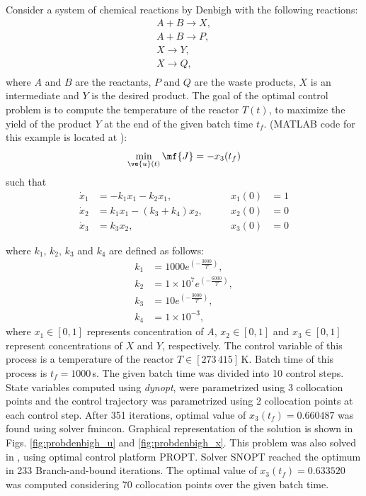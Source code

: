 Consider a system of chemical reactions by Denbigh \cite{den58} with the 
following reactions:
\begin{gather}
A + B \rightarrow X, \\
A + B \rightarrow P, \\
X \rightarrow Y, \\
X \rightarrow Q, \\
\end{gather}
where $A$ and $B$ are the reactants, $P$ and $Q$ are the waste products, $X$ is an intermediate and $Y$ is the desired product. The goal of the optimal control problem is to compute the temperature of the reactor $T(t)$, to maximize the yield of the product $Y$ at the end of the given batch time $t_f$. (MATLAB code for this example is located
at ):
\begin{equation}
\min_{\ve{u}(t)} \mf{J} = -x_{3}(t_{f}) \label{eq:denbigh_dae}
\end{equation}
such that
\begin{align}
\dot{x}_1 & =  -k_{1}x_{1} -k_{2}x_{1} , &\qquad x_1(0) &= 1 \\
\dot{x}_{2}& = k_{1}x_{1} - (k_{3} + k_{4})x_{2} , & \qquad x_2(0) & = 0 \\
\dot{x}_3 & =  k_{3}x_{2} , & \qquad x_3(0) & = 0 
\end{align}

where $k_{1}, \, k_{2}, \, k_{3}$ and $k_{4}$ are defined as follows:
\begin{align}
k_{1} &= 1000 e^{(-\frac{3000}{T})}, \\
k_{2} &= 1 \times 10^{7} e^{(-\frac{6000}{T})}, \\
k_{3} &= 10e^{(-\frac{3000}{T})}, \\
k_{4} &= 1 \times 10^{-3}, 
\end{align} where $x_{1} \in [0, 1] $  represents concentration
of $A$, $x_{2} \in [0, 1] $ and $x_{3} \in [0, 1]$  represent concentrations
of $X$ and $Y$, respectively. The control variable of this process is a temperature of the reactor $T \in [273 \,  415]$\,K.
Batch time of this process is $t_{f} = 1000$\,s. The given batch time was divided into 10 control steps. State variables computed using \emph{dynopt}, were parametrized using 3 collocation points and the control trajectory was parametrized using 2 collocation points at each control step.  After 351 iterations, optimal value of $x_{3}(t_{f}) = 0.660487$ was
found using solver fmincon. Graphical representation of the solution is shown in Figs. \ref{fig:probdenbigh_u}
and \ref{fig:probdenbigh_x}. This problem was also solved in \cite{rut10}, using optimal control platform PROPT. Solver SNOPT reached the optimum in 233 Branch-and-bound iterations. The optimal value of  $x_{3}(t_{f}) = 0.633520$ was computed considering 70 collocation points over the given batch time. 

